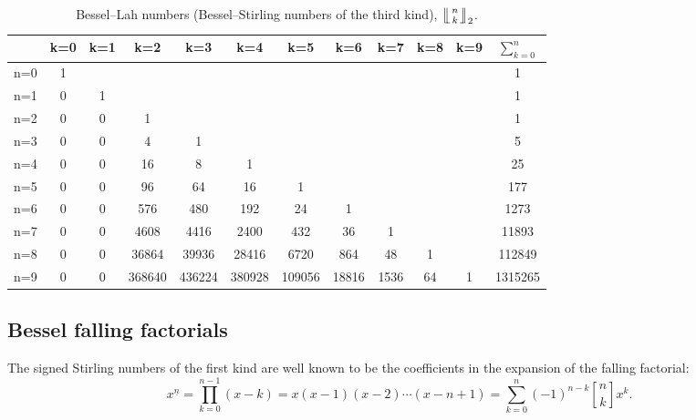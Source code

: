 \documentclass[a4paper]{amsart}
\numberwithin{equation}{section}
\newcommand{\Stirlingone}[0]{\genfrac[]{0pt}{}}
\newcommand{\mLah}[2]{\left\lfloor\mkern-5.5mu\left\lfloor\genfrac{}{}{0pt}{}{#1}{#2}\right\rfloor\mkern-5.5mu\right\rfloor}
\begin{document}
\begin{table}[htbp]
    \centering
    \small
    \begin{tabular}{|l|*{10}{c}|c|}
        \hline
          & k=0 & k=1 & k=2   & k=3   & k=4   & k=5   & k=6   & k=7   & k=8   & k=9   & $\sum_{k=0}^{n}$ \\
        \hline
        n=0 & 1   &     &       &       &       &       &       &       &       &       & 1                  \\
        n=1 & 0   & 1   &       &       &       &       &       &       &       &       & 1                  \\
        n=2 & 0   & 0   & 1     &       &       &       &       &       &       &       & 1                  \\
        n=3 & 0   & 0   & 4     & 1     &       &       &       &       &       &       & 5                  \\
        n=4 & 0   & 0   & 16    & 8     & 1     &       &       &       &       &       & 25                 \\
        n=5 & 0   & 0   & 96    & 64    & 16    & 1     &       &       &       &       & 177                \\
        n=6 & 0   & 0   & 576   & 480   & 192   & 24    & 1     &       &       &       & 1273               \\
        n=7 & 0   & 0   & 4608  & 4416  & 2400  & 432   & 36    & 1     &       &       & 11893              \\
        n=8 & 0   & 0   & 36864 & 39936 & 28416 & 6720  & 864   & 48    & 1     &       & 112849             \\
        n=9 & 0   & 0   & 368640& 436224& 380928& 109056& 18816 & 1536  & 64    & 1     & 1315265            \\
        \hline
    \end{tabular}
    \bigskip
    \caption{Bessel--Lah numbers (Bessel--Stirling numbers of the third kind), $\mLah{n}{k}_2$.}
    \label{tab-bessel-stirling3}
\end{table}

\subsection{Bessel falling factorials}

The signed Stirling numbers of the first kind are well known to be the coefficients in the expansion of the falling factorial:
\[
x^{\underline{n}} =\prod_{k=0}^{n-1}(x - k)= x(x-1)(x-2)\cdots(x-n+1) = \sum_{k=0}^n (-1)^{n-k} \Stirlingone{n}{k} x^k.
\]
\end{document}
